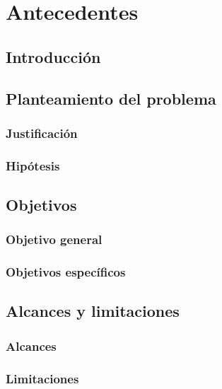 \chapter{Antecedentes}

\section{Introducción}

\section{Planteamiento del problema}

\subsection{Justificación}

\subsection{Hipótesis}

\section{Objetivos}
\subsection{Objetivo general}
\subsection{Objetivos específicos}

\section{Alcances y limitaciones}
\subsection{Alcances}
\subsection{Limitaciones}
